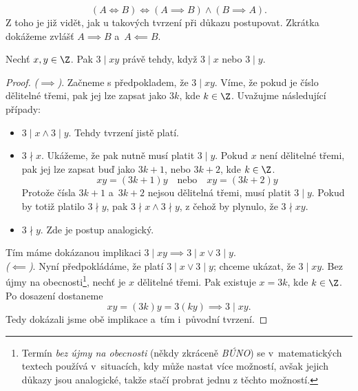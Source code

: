 \begin{equation*}
    (A \iff B) \iff (A \implies B) \land (B \implies A).
\end{equation*}
Z toho je již vidět, jak u takových tvrzení při důkazu postupovat. Zkrátka dokážeme zvlášť $A \implies B$ a~$A \impliedby B$.
\begin{proposition}
    Nechť $x,y\in\Z$. Pak $3 \mid xy$ právě tehdy, když $3 \mid x$ nebo $3 \mid y$.
\end{proposition}
\begin{proof}
    \textit{($\implies$)}. Začneme s předpokladem, že $3 \mid xy$. Víme, že pokud je číslo dělitelné třemi, pak jej lze zapsat jako $3k$, kde $k\in\Z$. Uvažujme následující případy:
    \begin{itemize}
        \item $3 \mid x \land 3 \mid y$. Tehdy tvrzení jistě platí.
        \item $3 \nmid x$. Ukážeme, že pak nutně musí platit $3 \mid y$. Pokud $x$ není dělitelné třemi, pak jej lze zapsat buď jako $3k+1$, nebo $3k+2$, kde $k\in\Z$. 
        \begin{equation*}
            xy=(3k+1)y\quad\text{nebo}\quad xy=(3k+2)y
        \end{equation*}
        Protože čísla $3k+1$ a~$3k+2$ nejsou dělitelná třemi, musí platit $3 \mid y$. Pokud by totiž platilo $3 \nmid y$, pak $3 \nmid x \land 3 \nmid y$, z čehož by plynulo, že $3\nmid xy$.
        \item $3 \nmid y$. Zde je postup analogický.
    \end{itemize}
    Tím máme dokázanou implikaci $3 \mid xy \implies 3 \mid x \lor 3 \mid y$.\\
    \textit{($\impliedby$)}. Nyní předpokládáme, že platí $3 \mid x \lor 3 \mid y$; chceme ukázat, že $3 \mid xy$. Bez újmy na obecnosti\footnote{Termín \emph{bez újmy na obecnosti} (někdy zkráceně \emph{BÚNO}) se v~matematických textech používá v~situacích, kdy může nastat více možností, avšak jejich důkazy jsou analogické, takže stačí probrat jednu z těchto možností.}, nechť je $x$ dělitelné třemi. Pak existuje $x=3k$, kde $k\in\Z$. Po dosazení dostaneme
    \begin{equation*}
        xy=(3k)y=3(ky) \implies 3 \mid xy.
    \end{equation*}
    Tedy dokázali jsme obě implikace a~tím i~původní tvrzení.
\end{proof}

